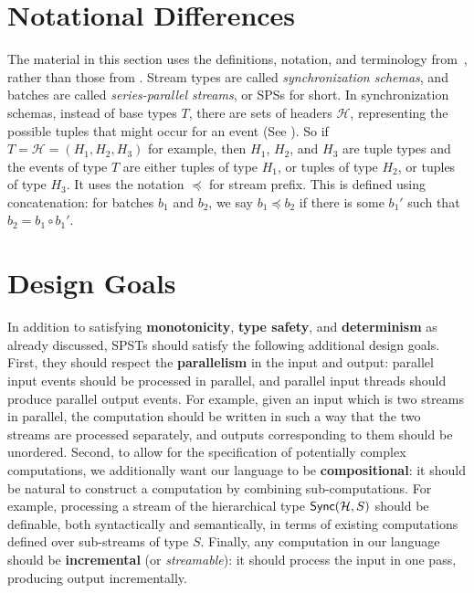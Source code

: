 \section{Notational Differences}

The material in this section uses the definitions, notation, and terminology from~,
rather than those from .
Stream types are called \emph{synchronization schemas},
and batches are called \emph{series-parallel streams}, or SPSs
for short.
In synchronization schemas, instead of base types $T$, there are sets of headers $\mathcal{H}$, representing the possible tuples that might occur for an event
(See ).
So if $T = \mathcal{H} = (H_1, H_2, H_3)$ for example, then $H_1$, $H_2$, and $H_3$ are tuple types and the events of type $T$ are either tuples of type $H_1$, or tuples of type $H_2$, or tuples of type $H_3$.
It uses the notation $\preceq$ for stream prefix.
This is defined using concatenation:
for batches $b_1$ and $b_2$, we say $b_1 \preceq b_2$ if there is some $b_1'$ such that $b_2 = b_1 \circ b_1'$.

\section{Design Goals}
\label{45:sec:design-goals}

In addition to satisfying \textbf{monotonicity}, \textbf{type safety}, and \textbf{determinism} as already discussed,
SPSTs should satisfy the following additional design goals.
First, they should respect the \textbf{parallelism}
in the input and output: parallel input events should be processed in parallel,
and parallel input threads should produce parallel output events.
For example, given an input which is two streams in parallel, the computation should be written in such a way that the two streams are processed separately, and outputs corresponding to them should be unordered.
Second,
to allow for the specification of potentially complex computations, we additionally want our language to be \textbf{compositional}: it should be natural to construct a computation by combining sub-computations.
For example, processing a stream of the hierarchical type $\mathsf{Sync}({\mathcal{H}}, S)$
should be definable, both syntactically and semantically, in terms of
existing computations defined over sub-streams of type $S$.
Finally, any computation in our language should be \textbf{incremental} (or \emph{streamable}): it should process the input in one pass, producing output incrementally.

